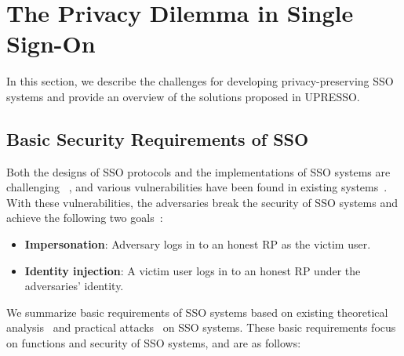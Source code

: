 \section{The Privacy Dilemma in Single Sign-On}
\label{sec:challenge}

In this section, we describe the challenges for developing privacy-preserving SSO systems and provide an overview of the solutions proposed in UPRESSO.



\subsection{Basic Security Requirements of SSO}
\label{subsec:basicrequirements}
Both the designs of SSO protocols and the implementations of SSO systems are challenging ~\cite{SPRESSO},
and various vulnerabilities have been found in existing systems~\cite{SomorovskyMSKJ12,WangCW12,ArmandoCCCPS13,ZhouE14,WangZLLYLG15,WangZLG16,YangLLZH16,MainkaMS16,MohsenS16,MainkaMSW17,YangLCZ18,YangLS17,ShiWL19}.
With these vulnerabilities, the adversaries break the security of SSO systems and achieve the following two goals~\cite{SPRESSO}:
\begin{itemize}
\item \textbf{Impersonation}: Adversary logs in to an honest RP as the victim user. %
\item  \textbf{Identity injection}: A victim user logs in to an honest RP under the adversaries' identity. %
\end{itemize}

We summarize basic requirements of SSO systems based on existing theoretical analysis~\cite{ArmandoCCCT08,FettKS16, FettKS17} and practical attacks~\cite{SomorovskyMSKJ12,WangCW12,ArmandoCCCPS13,ZhouE14,WangZLLYLG15,WangZLG16,YangLLZH16,MainkaMS16,MohsenS16,MainkaMSW17,YangLCZ18,YangLS17,ShiWL19} on SSO systems. These basic requirements focus on  functions and security of SSO systems, and are as follows: %

